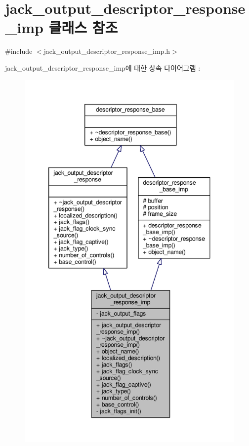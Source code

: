 \hypertarget{classavdecc__lib_1_1jack__output__descriptor__response__imp}{}\section{jack\+\_\+output\+\_\+descriptor\+\_\+response\+\_\+imp 클래스 참조}
\label{classavdecc__lib_1_1jack__output__descriptor__response__imp}


{\ttfamily \#include $<$jack\+\_\+output\+\_\+descriptor\+\_\+response\+\_\+imp.\+h$>$}



jack\+\_\+output\+\_\+descriptor\+\_\+response\+\_\+imp에 대한 상속 다이어그램 \+: 
\nopagebreak
\begin{figure}[H]
\begin{center}
\leavevmode
\includegraphics[height=550pt]{classavdecc__lib_1_1jack__output__descriptor__response__imp__inherit__graph}
\end{center}
\end{figure}



